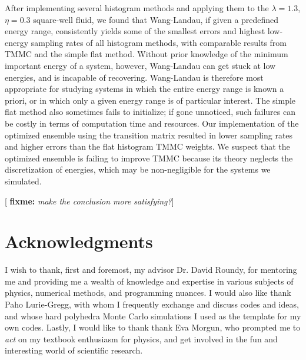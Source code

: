 \documentclass[11pt]{article}
\newcommand{\red}[1]{{\bf \color{red} #1}}
\newcommand{\fixme}[1]{[\red{fixme:} \emph{#1}]}
\begin{document}
After implementing several histogram methods and applying them to the
$\lambda=1.3$, $\eta=0.3$ square-well fluid, we found that
Wang-Landau, if given a predefined energy range, consistently yields
some of the smallest errors and highest low-energy sampling rates of
all histogram methods, with comparable results from TMMC and the
simple flat method. Without prior knowledge of the minimum important
energy of a system, however, Wang-Landau can get stuck at low
energies, and is incapable of recovering. Wang-Landau is therefore
most appropriate for studying systems in which the entire energy range
is known a priori, or in which only a given energy range is of
particular interest. The simple flat method also sometimes fails to
initialize; if gone unnoticed, such failures can be costly in terms of
computation time and resources. Our implementation of the optimized
ensemble using the transition matrix resulted in lower sampling rates
and higher errors than the flat histogram TMMC weights. We suspect
that the optimized ensemble is failing to improve TMMC because its
theory neglects the discretization of energies, which may be
non-negligible for the systems we simulated.

\fixme{make the conclusion more satisfying?}


\section{Acknowledgments}
\label{sec:acknowledgements}

I wish to thank, first and foremost, my advisor Dr. David Roundy, for
mentoring me and providing me a wealth of knowledge and expertise in
various subjects of physics, numerical methods, and programming
nuances. I would also like thank Paho Lurie-Gregg, with whom I
frequently exchange and discuss codes and ideas, and whose hard
polyhedra Monte Carlo simulations I used as the template for my own
codes. Lastly, I would like to thank thank Eva Morgun, who prompted me
to {\it act} on my textbook enthusiasm for physics, and get involved
in the fun and interesting world of scientific research.


\nocite{*} 
\end{document}
